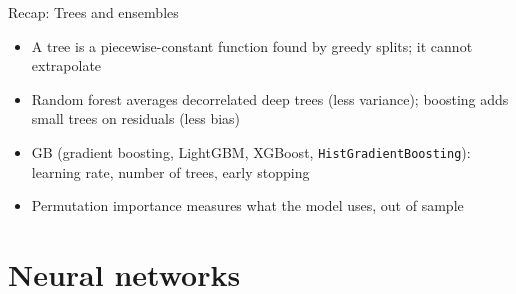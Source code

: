 \begin{frame}{Recap: Trees and ensembles}
\itemsize{\small}
\begin{itemize}
    \item A tree is a piecewise-constant function found by greedy splits; it cannot extrapolate
    \item Random forest averages decorrelated deep trees (less variance); boosting adds small trees on residuals (less bias)
    \item GB (gradient boosting, LightGBM, XGBoost, \texttt{HistGradientBoosting}): learning rate, number of trees, early stopping
    \item Permutation importance measures what the model uses, out of sample
\end{itemize}
\end{frame}


\section{Neural networks}

